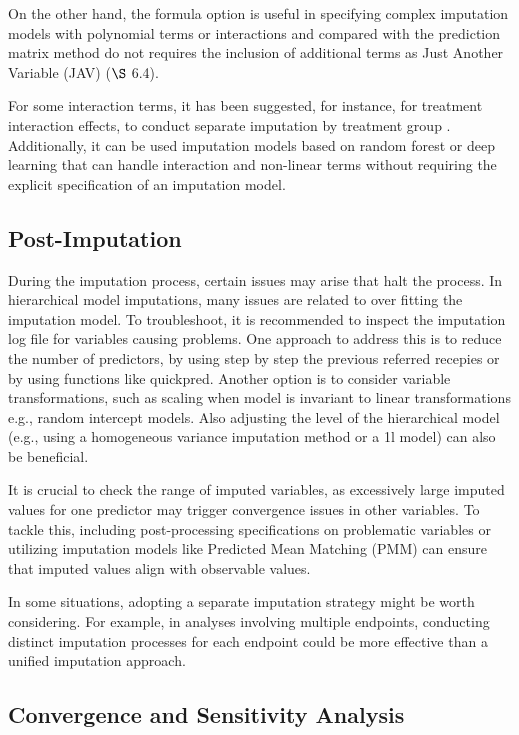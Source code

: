 \documentclass[
  article]{jss}
\begin{document}
On the other hand, the formula option is useful in specifying complex
imputation models with polynomial terms or interactions and compared
with the prediction matrix method do not requires the inclusion of
additional terms as Just Another Variable (JAV) \cite{buur18}(\(\S\)
6.4).

For some interaction terms, it has been suggested, for instance, for
treatment interaction effects, to conduct separate imputation by
treatment group \cite{zhang2023}. Additionally, it can be used
imputation models based on random forest or deep learning that can
handle interaction and non-linear terms without requiring the explicit
specification of an imputation model.

\hypertarget{post-imputation}{%
\subsection{Post-Imputation}\label{post-imputation}}

During the imputation process, certain issues may arise that halt the
process. In hierarchical model imputations, many issues are related to
over fitting the imputation model. To troubleshoot, it is recommended to
inspect the imputation log file for variables causing problems. One
approach to address this is to reduce the number of predictors, by using
step by step the previous referred recepies or by using functions like
quickpred. Another option is to consider variable transformations, such
as scaling when model is invariant to linear transformations e.g.,
random intercept models. Also adjusting the level of the hierarchical
model (e.g., using a homogeneous variance imputation method or a 1l
model) can also be beneficial.

It is crucial to check the range of imputed variables, as excessively
large imputed values for one predictor may trigger convergence issues in
other variables. To tackle this, including post-processing
specifications on problematic variables or utilizing imputation models
like Predicted Mean Matching (PMM) can ensure that imputed values align
with observable values.

In some situations, adopting a separate imputation strategy might be
worth considering. For example, in analyses involving multiple
endpoints, conducting distinct imputation processes for each endpoint
could be more effective than a unified imputation approach.

\hypertarget{convergence-and-sensitivity-analysis}{%
\subsection{Convergence and Sensitivity
Analysis}\label{convergence-and-sensitivity-analysis}}
\end{document}
